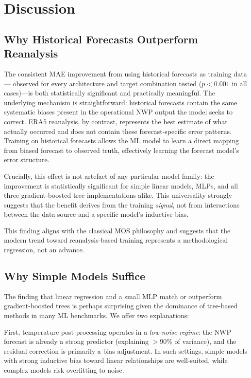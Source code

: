 \documentclass[12pt, letterpaper]{article}
\begin{document}
\section{Discussion}
\label{sec:discussion}

\subsection{Why Historical Forecasts Outperform Reanalysis}

The consistent MAE improvement from using historical forecasts as training data---
observed for every architecture and target combination tested ($p < 0.001$ in all
cases)---is both statistically significant and practically meaningful. The underlying
mechanism is straightforward: historical forecasts contain the same systematic
biases present in the operational NWP output the model seeks to correct. ERA5
reanalysis, by contrast, represents the best estimate of what actually occurred
and does not contain these forecast-specific error patterns. Training on historical
forecasts allows the ML model to learn a direct mapping from biased forecast to
observed truth, effectively learning the forecast model's error structure.

Crucially, this effect is not artefact of any particular model family: the
improvement is statistically significant for simple linear models, MLPs, and all
three gradient-boosted tree implementations alike. This universality strongly
suggests that the benefit derives from the training \emph{signal}, not from
interactions between the data source and a specific model's inductive bias.

This finding aligns with the classical MOS philosophy \citep{glahn1972mos} and
suggests that the modern trend toward reanalysis-based training represents a
methodological regression, not an advance.

\subsection{Why Simple Models Suffice}

The finding that linear regression and a small MLP match or outperform
gradient-boosted trees is perhaps surprising given the dominance of tree-based
methods in many ML benchmarks. We offer two explanations:

First, temperature post-processing operates in a \emph{low-noise regime}: the
NWP forecast is already a strong predictor (explaining $>$90\% of variance), and
the residual correction is primarily a bias adjustment. In such settings, simple
models with strong inductive bias toward linear relationships are well-suited,
while complex models risk overfitting to noise.
\end{document}
